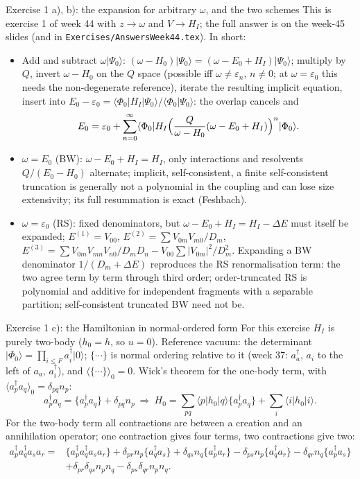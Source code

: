 \documentclass[aspectratio=169,10pt]{beamer}
\newcommand{\ket}[1]{\vert #1\rangle}
\newcommand{\braket}[2]{\langle #1\vert #2\rangle}
\newcommand{\mel}[3]{\langle #1\lvert #2\rvert #3\rangle}
\newcommand{\av}[1]{\langle #1\rangle_0}
\newcommand{\cre}[1]{a_{#1}^{\dagger}}
\newcommand{\ann}[1]{a_{#1}}
\newcommand{\no}[1]{\bigl\{#1\bigr\}}
\newcommand{\ph}{\Phi_0}
\begin{document}
\begin{frame}{Exercise 1 a), b): the expansion for arbitrary $\omega$, and the two schemes}
\small
This is exercise 1 of week 44 with $z\to\omega$ and $V\to H_I$; the full answer is on the week-45 slides (and in \texttt{Exercises/AnswersWeek44.tex}). In short:
\begin{itemize}
\item Add and subtract $\omega\ket{\Psi_0}$: $(\omega-H_0)\ket{\Psi_0}=(\omega-E_0+H_I)\ket{\Psi_0}$; multiply by $Q$, invert $\omega-H_0$ on the $Q$ space (possible iff $\omega\ne\varepsilon_n$, $n\ne0$; at $\omega=\varepsilon_0$ this needs the non-degenerate reference), iterate the resulting implicit equation, insert into $E_0-\varepsilon_0=\mel{\ph}{H_I}{\Psi_0}/\braket{\ph}{\Psi_0}$: the overlap cancels and
\[
E_0=\varepsilon_0+\sum_{n=0}^\infty\mel{\ph}{H_I\Bigl(\frac{Q}{\omega-H_0}(\omega-E_0+H_I)\Bigr)^n}{\ph}.
\]
\item $\omega=E_0$ (BW): $\omega-E_0+H_I=H_I$, only interactions and resolvents $Q/(E_0-H_0)$ alternate; implicit, self-consistent, a finite self-consistent truncation is generally not a polynomial in the coupling and can lose size extensivity; its full resummation is exact (Feshbach).
\item $\omega=\varepsilon_0$ (RS): fixed denominators, but $\omega-E_0+H_I=H_I-\Delta E$ must itself be expanded; $E^{(1)}=V_{00}$, $E^{(2)}=\sum V_{0m}V_{m0}/D_m$, $E^{(3)}=\sum V_{0m}V_{mn}V_{n0}/D_mD_n-V_{00}\sum|V_{0m}|^2/D_m^2$. Expanding a BW denominator $1/(D_m+\Delta E)$ reproduces the RS renormalisation term: the two agree term by term through third order; order-truncated RS is polynomial and additive for independent fragments with a separable partition; self-consistent truncated BW need not be.
\end{itemize}
\end{frame}

\begin{frame}{Exercise 1 c): the Hamiltonian in normal-ordered form}
\small
For this exercise $H_I$ is purely two-body ($h_0=h$, so $u=0$). Reference vacuum: the determinant $\ket{\ph}=\prod_{i\le F}\cre{i}\ket{0}$; $\no{\cdots}$ is normal ordering relative to it (week 37: $\cre{a}$, $\ann{i}$ to the left of $\ann{a}$, $\cre{i}$), and $\av{\no{\cdots}}=0$. Wick's theorem for the one-body term, with $\av{\cre{p}\ann{q}}=\delta_{pq}n_p$:
\[
\cre{p}\ann{q}=\no{\cre{p}\ann{q}}+\delta_{pq}n_p
\ \Longrightarrow\
H_0=\sum_{pq}\mel{p}{h_0}{q}\no{\cre{p}\ann{q}}+\sum_i\mel{i}{h_0}{i}.
\]
For the two-body term all contractions are between a creation and an annihilation operator; one contraction gives four terms, two contractions give two:
\begin{align*}
\cre{p}\cre{q}\ann{s}\ann{r}={}&\no{\cre{p}\cre{q}\ann{s}\ann{r}}
+\delta_{pr}n_p\no{\cre{q}\ann{s}}+\delta_{qs}n_q\no{\cre{p}\ann{r}}-\delta_{ps}n_p\no{\cre{q}\ann{r}}-\delta_{qr}n_q\no{\cre{p}\ann{s}}\\
&+\delta_{pr}\delta_{qs}n_pn_q-\delta_{ps}\delta_{qr}n_pn_q .
\end{align*}
\end{frame}
\end{document}
